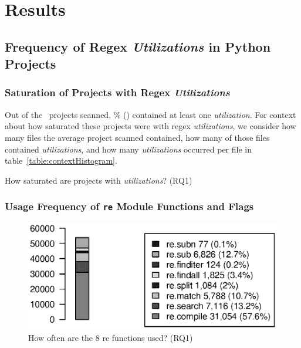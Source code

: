 \section{Results}
\label{sec:results}
\subsection{Frequency of Regex \emph{Utilizations} in Python Projects}
\subsubsection{Saturation of Projects with Regex \emph{Utilizations}}
Out of the \ projects scanned, \% () contained at least one \emph{utilization}.  For context about how saturated these projects were with regex \emph{utilizations}, we consider how many files the average project scanned contained, how many of those files contained \emph{utilizations}, and how many \emph{utilizations} occurred per file in table~\ref{table:contextHistogram}.

\begin{table}[tb]
\centering

\caption{How saturated are projects with \emph{utilizations}? (RQ1)}
\label{table:contextHistogram}
\end{table}

\subsubsection{Usage Frequency of {\tt re} Module Functions and Flags}

\begin{figure}[tb]
\centering
\includegraphics[width=\columnwidth]{../analysis_output/partFunctions.eps}
\caption{How often are the 8 re functions used? (RQ1)}
\label{fig:partFunctions}
\end{figure}

